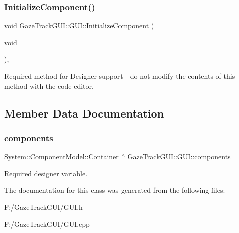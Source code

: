 \subsubsection{\texorpdfstring{Initialize\+Component()}{InitializeComponent()}}
{\footnotesize\ttfamily void Gaze\+Track\+G\+U\+I\+::\+G\+U\+I\+::\+Initialize\+Component (\begin{DoxyParamCaption}\item[{void}]{ }\end{DoxyParamCaption})\hspace{0.3cm}{\ttfamily [inline]}, {\ttfamily [private]}}



Required method for Designer support -\/ do not modify the contents of this method with the code editor. 



\subsection{Member Data Documentation}
\mbox{\label{class_gaze_track_g_u_i_1_1_g_u_i_a1ede89cbcd8850e42ae46ef3ff7e41c7}} 
\subsubsection{\texorpdfstring{components}{components}}
{\footnotesize\ttfamily System\+::\+Component\+Model\+::\+Container $^\wedge$ Gaze\+Track\+G\+U\+I\+::\+G\+U\+I\+::components\hspace{0.3cm}{\ttfamily [private]}}



Required designer variable. 



The documentation for this class was generated from the following files\+:\begin{DoxyCompactItemize}
\item 
F\+:/\+Gaze\+Track\+G\+U\+I/G\+U\+I.\+h\item 
F\+:/\+Gaze\+Track\+G\+U\+I/G\+U\+I.\+cpp\end{DoxyCompactItemize}

